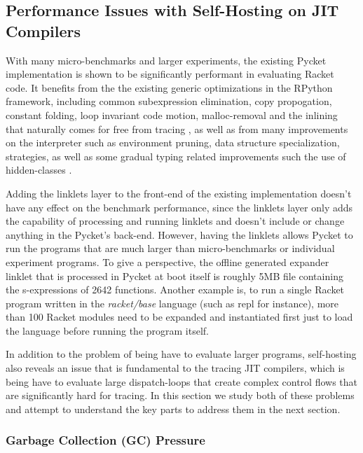 \subsection{Performance Issues with Self-Hosting on JIT Compilers}
\label{subsec:performance}

With many micro-benchmarks and larger experiments, the existing Pycket
implementation is shown to be significantly performant in evaluating
Racket code. It benefits from the the existing generic optimizations
in the RPython framework, including common subexpression elimination,
copy propogation, constant folding, loop invariant code motion,
malloc-removal and the inlining that naturally comes for free from
tracing \cite{loop-aware:12, hotpath:06, malloc-removal:11}, as well
as from many improvements on the interpreter such as environment
pruning, data structure specialization, strategies, as well as some
gradual typing related improvements such the use of hidden-classes
\cite{pycket15, pycket17}.

Adding the linklets layer to the front-end of the existing
implementation doesn't have any effect on the benchmark performance,
since the linklets layer only adds the capability of processing and
running linklets and doesn't include or change anything in the
Pycket's back-end. However, having the linklets allows Pycket to run
the programs that are much larger than micro-benchmarks or individual
experiment programs. To give a perspective, the offline generated
expander linklet that is processed in Pycket at boot itself is roughly
5MB file containing the s-expressions of 2642 functions. Another
example is, to run a single Racket program written in the
\emph{racket/base} language (such as repl for instance), more than 100
Racket modules need to be expanded and instantiated first just to load
the language before running the program itself.

In addition to the problem of being have to evaluate larger programs,
self-hosting also reveals an issue that is fundamental to the tracing
JIT compilers, which is being have to evaluate large dispatch-loops
that create complex control flows that are significantly hard for
tracing. In this section we study both of these problems and attempt
to understand the key parts to address them in the next section.

\subsubsection{Garbage Collection (GC) Pressure}

